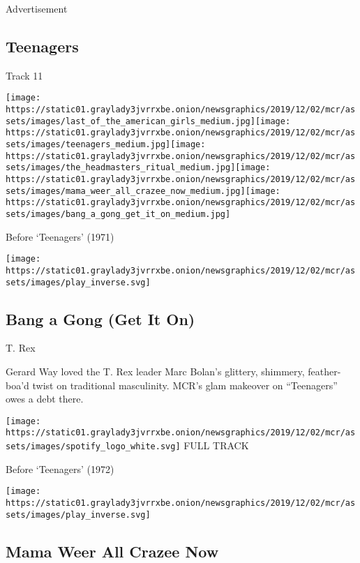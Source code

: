Advertisement

\hypertarget{teenagers}{%
\subsection{Teenagers}\label{teenagers}}

Track 11

\texttt{[image: https://static01.graylady3jvrrxbe.onion/newsgraphics/2019/12/02/mcr/assets/images/last\_of\_the\_american\_girls\_medium.jpg]}\texttt{[image: https://static01.graylady3jvrrxbe.onion/newsgraphics/2019/12/02/mcr/assets/images/teenagers\_medium.jpg]}\texttt{[image: https://static01.graylady3jvrrxbe.onion/newsgraphics/2019/12/02/mcr/assets/images/the\_headmasters\_ritual\_medium.jpg]}\texttt{[image: https://static01.graylady3jvrrxbe.onion/newsgraphics/2019/12/02/mcr/assets/images/mama\_weer\_all\_crazee\_now\_medium.jpg]}\texttt{[image: https://static01.graylady3jvrrxbe.onion/newsgraphics/2019/12/02/mcr/assets/images/bang\_a\_gong\_get\_it\_on\_medium.jpg]}

Before `Teenagers' (1971)

\texttt{[image: https://static01.graylady3jvrrxbe.onion/newsgraphics/2019/12/02/mcr/assets/images/play\_inverse.svg]}

\hypertarget{bang-a-gong-get-it-on}{%
\subsection{Bang a Gong (Get It On)}\label{bang-a-gong-get-it-on}}

T. Rex

Gerard Way loved the T. Rex leader Marc Bolan's glittery, shimmery,
feather-boa'd twist on traditional masculinity. MCR's glam makeover on
``Teenagers'' owes a debt there.

\href{https://open.spotify.com/track/6FsQrRpBLgsrFeAeiQqytm?si=GVCfQr6jQBGAT41iHuPVmw}{}

\texttt{[image: https://static01.graylady3jvrrxbe.onion/newsgraphics/2019/12/02/mcr/assets/images/spotify\_logo\_white.svg]}
FULL TRACK

Before `Teenagers' (1972)

\texttt{[image: https://static01.graylady3jvrrxbe.onion/newsgraphics/2019/12/02/mcr/assets/images/play\_inverse.svg]}

\hypertarget{mama-weer-all-crazee-now}{%
\subsection{Mama Weer All Crazee Now}\label{mama-weer-all-crazee-now}}

